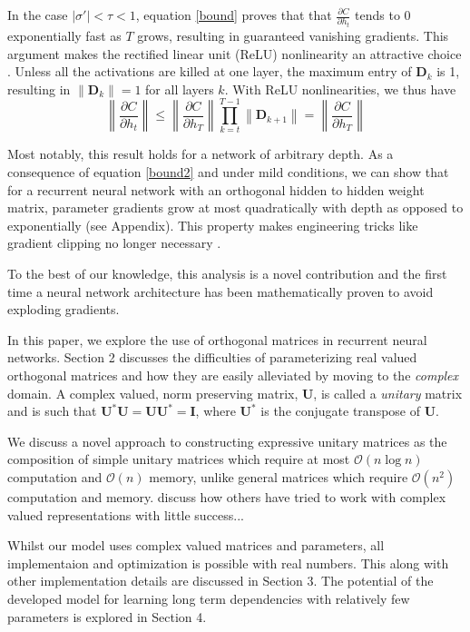 \documentclass{article} %
\newcommand{\matr}[1]{\mathbf{#1}}
\newcommand\norm[1]{\left\lVert#1\right\rVert}
\begin{document}
In the case $|\sigma'| < \tau < 1$, equation \ref{bound} proves that 
that $\frac{\partial C}{\partial h_t}$ tends to 0 exponentially fast as $T$ grows, 
resulting in guaranteed vanishing gradients. 
This argument makes the rectified linear unit (ReLU) nonlinearity an attractive choice
\citep{Glorot2011, Nair2010}. Unless all the activations are killed at one layer, 
the maximum entry of $\matr{D}_k$ is 1, resulting in
$\norm{\matr{D}_k} = 1$ for all layers $k$. With ReLU nonlinearities, we thus have
\begin{equation}
  \norm{\frac{\partial C}{\partial h_t}} \leq \norm{ \frac{\partial C}{\partial h_T}} 
  \prod_{k=t}^{T-1} \norm{\matr{D}_{k+1}} = \norm{\frac{\partial C}{\partial h_T}}
\label{bound2}
\end{equation}

Most notably, this result holds for a network of arbitrary depth. 
As a consequence of equation \ref{bound2} and under mild conditions, we can show that
for a recurrent neural network with an orthogonal hidden to hidden weight matrix, 
parameter gradients grow at most quadratically with depth as opposed to exponentially
{\color{red}(see Appendix)}. This property makes engineering tricks like gradient clipping no longer
necessary \citep{Pascanu2013}.

To the best of our knowledge, this analysis is a novel contribution and the first time a 
neural network architecture has been mathematically proven to avoid exploding gradients. 

In this paper, we explore the use of orthogonal matrices in recurrent neural networks. 
Section 2 discusses the difficulties of parameterizing real valued orthogonal matrices and how
they are easily alleviated by moving to the \textit{complex} domain. 
A complex valued, norm preserving matrix,
$\matr{U}$, is called a \textit{unitary} matrix and is such that 
$\matr{U}^* \matr{U} = \matr{U} \matr{U}^* = \matr{I}$, where $\matr{U}^*$ is the conjugate transpose
of $\matr{U}$.   

We discuss a novel approach to constructing expressive unitary matrices as the composition of simple
unitary matrices which require at most $\mathcal{O}(n \log n)$ computation and $\mathcal{O}(n)$ memory,
unlike general matrices which require $\mathcal{O}(n^2)$ computation and memory. {\color{red} discuss how 
others have tried to work with complex valued representations with little success... }

Whilst our model uses complex valued matrices and parameters, all implementaion and optimization is 
possible with real numbers. This along with other implementation details are discussed in Section 3.
The potential of the developed model for learning long term dependencies with relatively few parameters is
explored in Section 4.
\end{document}
